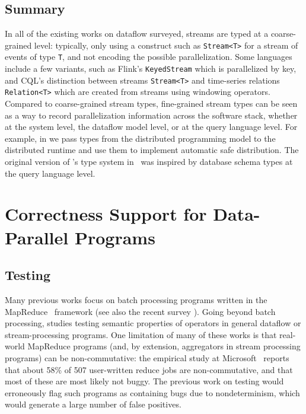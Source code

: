 \subsection{Summary}

In all of the existing works on dataflow surveyed, streams are typed at a coarse-grained level: typically, only using a construct such as \texttt{Stream<T>} for a stream of events of type \texttt{T}, and not encoding the possible parallelization.
Some languages include a few variants, such as Flink's \texttt{KeyedStream} which is parallelized by key, and CQL's distinction between streams \texttt{Stream<T>} and time-series relations \texttt{Relation<T>} which are created from streams using windowing operators.
Compared to coarse-grained stream types, fine-grained stream types can be seen as a way to record parallelization information across the software stack, whether at the system level, the dataflow model level, or at the query language level.
For example, in  we pass types from the distributed programming model to the distributed runtime and use them to implement automatic safe distribution.
The original version of 's type system in~ was inspired by database schema types at the query language level.

\section{Correctness Support for Data-Parallel Programs}

\subsection{Testing}

Many previous works focus on batch processing programs written in the MapReduce~\cite{dean2008mapreduce} framework \cite{csallner2011new,xu2013semantic,marynowski2012testing,chen2016commutativity} (see also the recent survey \cite{moran2019testing}). Going beyond batch processing, \cite{xu2013testing} studies testing semantic properties of operators in general dataflow or stream-processing programs.
One limitation of many of these works \cite{csallner2011new,xu2013semantic,xu2013testing,chen2016commutativity} is that real-world MapReduce programs (and, by extension, aggregators in stream processing programs) can be non-commutative: the empirical study at Microsoft~\cite{xiao2014nondeterminism} reports that about 58\% of 507 user-written reduce jobs are non-commutative, and that most of these are most likely not buggy. The previous work on testing would erroneously flag such programs as containing bugs due to nondeterminism, which would generate a large number of false positives.

